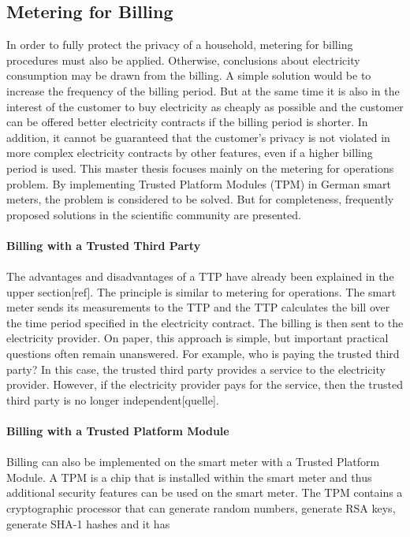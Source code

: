 \subsection{Metering for Billing}
In order to fully protect the privacy of a household, metering for billing procedures must also be applied. Otherwise, conclusions about electricity consumption may be drawn from the billing. A simple solution would be to increase the frequency of the billing period. But at the same time it is also in the interest of the customer to buy electricity as cheaply as possible and the customer can be offered better electricity contracts if the billing period is shorter. In addition, it cannot be guaranteed that the customer's privacy is not violated in more complex electricity contracts by other features, even if a higher billing period is used. %
This master thesis focuses mainly on the metering for operations problem. 
By implementing Trusted Platform Modules (TPM) in German smart meters, the problem is considered to be solved. But for completeness, frequently proposed solutions in the scientific community are presented.\\
\\
\textbf{Billing with a Trusted Third Party}
\\
\\
The advantages and disadvantages of a TTP have already been explained in the upper section[ref]. The principle is similar to metering for operations. The smart meter sends its measurements to the TTP and the TTP calculates the bill over the time period specified in the electricity contract. The billing is then sent to the electricity provider. On paper, this approach is simple, but important practical questions often remain unanswered. For example, who is paying the trusted third party? In this case, the trusted third party provides a service to the electricity provider. However, if the electricity provider pays for the service, then the trusted third party is no longer independent[quelle].\\
\\
\textbf{Billing with a Trusted Platform Module}
\\
\\
Billing can also be implemented on the smart meter with a Trusted Platform Module. A TPM is a chip that is installed within the smart meter and thus additional security features can be used on the smart meter. The TPM contains a cryptographic processor that can generate random numbers, generate RSA keys, generate SHA-1 hashes and it has
